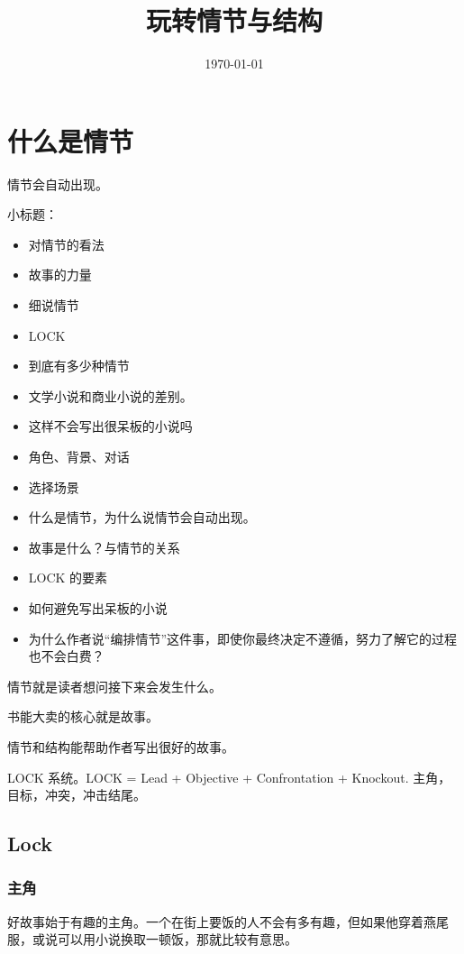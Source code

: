 \documentclass[11pt, twoside, hidelinks]{memoir}
\date{\today}
\title{玩转情节与结构}
\begin{document}
\maketitle
\tableofcontents

\chapter{什么是情节}
\label{sec:org225a34c}
情节会自动出现。

小标题：
\begin{itemize}
\item 对情节的看法
\item 故事的力量
\item 细说情节
\item LOCK
\item 到底有多少种情节
\item 文学小说和商业小说的差别。
\item 这样不会写出很呆板的小说吗
\item 角色、背景、对话
\item 选择场景
\end{itemize}



\begin{itemize}
\item 什么是情节，为什么说情节会自动出现。
\item 故事是什么？与情节的关系
\item LOCK 的要素
\item 如何避免写出呆板的小说
\item 为什么作者说“编排情节”这件事，即使你最终决定不遵循，努力了解它的过程也不会白费？
\end{itemize}


情节就是读者想问接下来会发生什么。

书能大卖的核心就是故事。

情节和结构能帮助作者写出很好的故事。

LOCK 系统。LOCK = Lead + Objective + Confrontation + Knockout.
主角，目标，冲突，冲击结尾。
\section{Lock}
\label{Lock system}
\subsection{主角}
\label{sec:orgb2963d4}
好故事始于有趣的主角。一个在街上要饭的人不会有多有趣，但如果他穿着燕尾服，或说可以用小说换取一顿饭，那就比较有意思。
\end{document}

